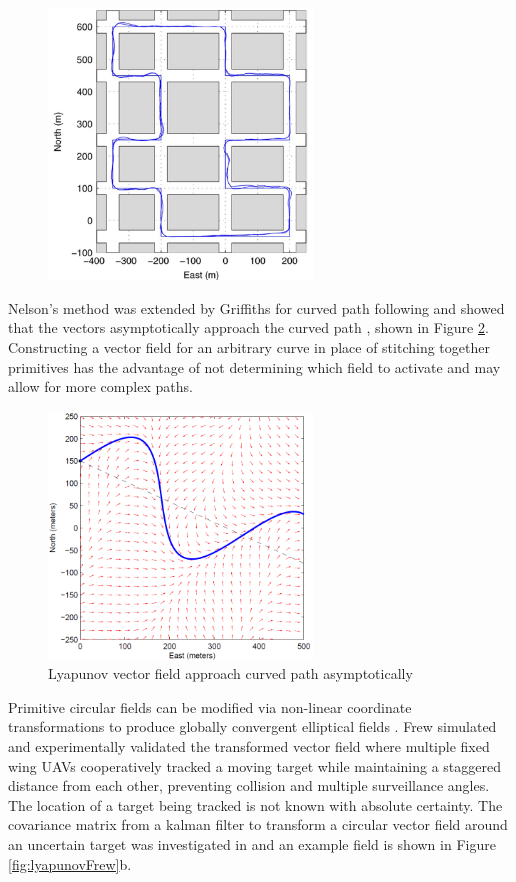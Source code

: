 \documentclass[numbered,pdftex]{ohio-etd}
\begin{document}
\begin{figure}[H]
	\centering
	\includegraphics[width=7cm]{PaperFigures/urbanFollowingNelson}
	\caption{}
	\label{fig:urbanfollowingnelson}
\end{figure}


Nelson's method was extended by Griffiths for curved path following and showed that the vectors asymptotically approach the curved path \cite{griffiths_vector_2006}, shown in Figure \ref{fig:griffiths}. Constructing a vector field for an arbitrary curve in place of stitching together primitives has the advantage of not determining which field to activate and may allow for more complex paths.

\begin{figure}[H]
	\centering
	\includegraphics[width=7cm]{PaperFigures/griffiths}
	\caption{Lyapunov vector field approach curved path asymptotically}
	\label{fig:griffiths}
\end{figure}


Primitive circular fields can be modified via non-linear coordinate transformations to produce globally convergent elliptical fields \cite{frew_lyapunov_nodate}\cite{frew_cooperative_2007}. Frew simulated and experimentally validated the transformed vector field where multiple fixed wing UAVs cooperatively tracked a moving target while maintaining a staggered distance from each other, preventing collision and multiple surveillance angles. The location of a target being tracked is not known with absolute certainty. The covariance matrix from a kalman filter to transform a circular vector field around an uncertain target was investigated in \cite{frew_cooperative_2007} and an example field is shown in Figure \ref{fig:lyapunovFrew}b.
\end{document}
